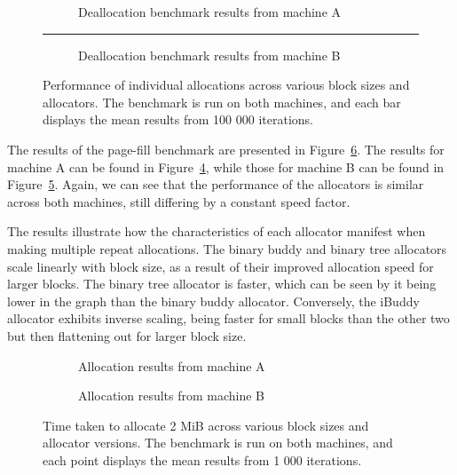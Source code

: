 \begin{figure}[h]
    \centering
    \begin{subfigure}{\textwidth}
        \centering
        \captionsetup{justification=centering}
        
        \caption{Deallocation benchmark results from machine A}
        \label{fig:deallocA}
    \end{subfigure}
    \rule{\textwidth}{0.1pt}
    \begin{subfigure}{\textwidth}
        \centering
        \captionsetup{justification=centering}
        
        \caption{Deallocation benchmark results from machine B}
        \label{fig:deallocB}
    \end{subfigure}
    \caption{Performance of individual allocations across various block sizes and allocators. The benchmark is run on both machines, and each bar displays the mean results from 100 000 iterations.}
    \label{fig:deallocbenchmark}
\end{figure}

The results of the page-fill benchmark are presented in Figure~\ref{fig:allocpage}. The results for machine A can be found in Figure~\ref{fig:allocpageA}, while those for machine B can be found in Figure~\ref{fig:allocpageB}. Again, we can see that the performance of the allocators is similar across both machines, still differing by a constant speed factor.

The results illustrate how the characteristics of each allocator manifest when making multiple repeat allocations. The binary buddy and binary tree allocators scale linearly with block size, as a result of their improved allocation speed for larger blocks. The binary tree allocator is faster, which can be seen by it being lower in the graph than the binary buddy allocator. Conversely, the iBuddy allocator exhibits inverse scaling, being faster for small blocks than the other two but then flattening out for larger block size.
\begin{figure}[h]
    \centering
    \begin{subfigure}{0.495\textwidth}
        \centering
        \captionsetup{justification=centering}
        
        \caption{Allocation results from machine A}
        \label{fig:allocpageA}
    \end{subfigure}
    \begin{subfigure}{0.495\textwidth}
        \centering
        \captionsetup{justification=centering}
        
        \caption{Allocation results from machine B}
        \label{fig:allocpageB}
    \end{subfigure}
    \caption{Time taken to allocate 2 MiB across various block sizes and allocator versions. The benchmark is run on both machines, and each point displays the mean results from 1 000 iterations.}
    \label{fig:allocpage}
\end{figure}

